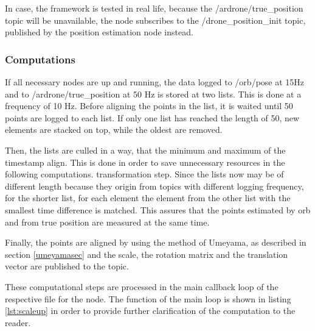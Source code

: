 	In case, the framework is tested in real life, because the /ardrone/true\_position topic will be unavailable, 
	the node subscribes to the /drone\_position\_init topic, published by the position estimation node instead. 
	
	\subsubsection{Computations}
	
	If all necessary nodes are up and running, the data  logged to /orb/pose at 15Hz and to /ardrone/true\_position at 50 Hz is stored at two lists. This is done at 
	a frequency of 10 Hz. Before aligning the points in the list, it is waited until 50 points are logged to each list. If only one list has reached 
	the length of 50, new elements are stacked on top, while the oldest are removed. 
	
	Then, the lists are culled in a way, that the minimum and maximum of the timestamp align. This is done in order to save unnecessary resources in the following computations.
	transformation step. Since the lists now may be of different length because they origin from topics with different logging frequency, 
	for the shorter list, for each element the element from the other list with the smallest time difference is matched. This assures that the points 
	estimated by orb and from true position are measured at the same time. 
	
	Finally, the points are aligned by using the method of Umeyama, as described in section \ref{umeyamasec} and the scale, the rotation matrix and the translation
    vector are published to the topic. 
	
	These computational steps are processed in the main callback loop of the respective file for the node. The function of the main loop is shown in listing \ref{lst:scaleup} in order 
	to provide further clarification of the computation to the reader. 
	
